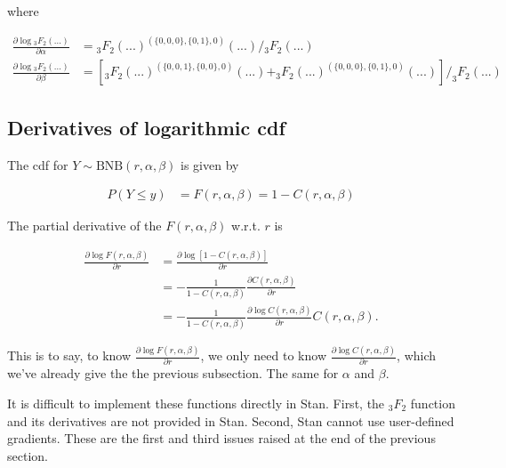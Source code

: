 \documentclass[11pt]{article}
\begin{document}
where

\begin{equation}
  \begin{aligned}
\frac{\partial \log {}_3F_2(...)}{\partial \alpha} 
&=  {}_3F_2(...)^{(\{0,0,0\},\{0,1\},0)}(...)  / {}_3F_2(...) \\
\frac{\partial \log {}_3F_2(...)}{\partial \beta}
&= \left[ _3F_2(...)^{(\{0,0,1\},\{0,0\},0)}(...) + _3F_2(...)^{(\{0,0,0\},\{0,1\},0)}(...) \right]  / _3F_2(...)
  \end{aligned}
\end{equation}




\subsection*{Derivatives of logarithmic cdf}
The cdf for $Y\sim \text{BNB}(r,\alpha,\beta)$ is given by

\begin{equation}
\begin{aligned}
 P(Y\leq y) &= F(r,\alpha,\beta) = 1 - C(r,\alpha,\beta)
\end{aligned}
\end{equation}

The partial derivative of the $F(r,\alpha,\beta)$ w.r.t. $r$ is

\begin{equation}
\begin{aligned}
	\frac{\partial \log F(r,\alpha,\beta)}{\partial r} &= \frac{\partial \log [1 - C(r,\alpha,\beta)]}{\partial r}\\
	 &= - \frac{1}{1 - C(r,\alpha,\beta)} \frac{\partial C(r,\alpha,\beta)}{\partial r} \\
	 &= - \frac{1}{1 - C(r,\alpha,\beta)} \frac{\partial \log C(r,\alpha,\beta)}{\partial r} C(r,\alpha,\beta).
\end{aligned}
\end{equation}

This is to say, to know $\frac{\partial \log F(r,\alpha,\beta)}{\partial r}$, we only need to know $\frac{\partial \log C(r,\alpha,\beta)}{\partial r}$, which we've already give the the previous subsection. The same for $\alpha$ and $\beta$.



It is difficult to implement these functions directly in Stan. First, the ${}_3F_2$ function and its derivatives are not provided in Stan. Second, Stan cannot use user-defined gradients. These are the first and third issues raised at the end of the previous section.
\end{document}

